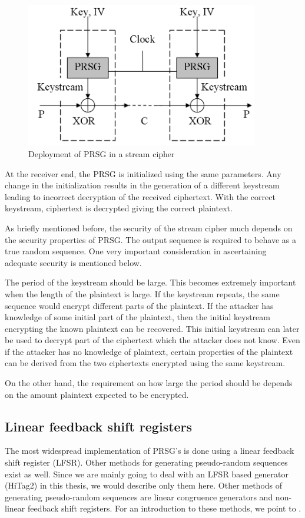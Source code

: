 \begin{figure}[ht!]
	\centering
		\includegraphics[width=4in]{./figures/stream-cipher.PNG}
	\caption{Deployment of PRSG in a stream cipher}	
	\label{fig:stream-cipher}
\end{figure}

At the receiver end, the PRSG is initialized using the same parameters. Any change in the initialization results in the generation of a different keystream leading to incorrect decryption of the received ciphertext. With the correct keystream, ciphertext is decrypted giving the correct plaintext. 

As briefly mentioned before, the security of the stream cipher much depends on the security properties of PRSG. The output sequence is required to behave as a true random sequence. One very important consideration in ascertaining adequate security \cite{robshaw1995sct} is mentioned below.

The period of the keystream should be large. This becomes extremely important when the length of the plaintext is large. If the keystream repeats, the same sequence would encrypt different parts of the plaintext. If the attacker has knowledge of some initial part of the plaintext, then the initial keystream encrypting the known plaintext can be recovered. This initial keystream can later be used to decrypt part of the ciphertext which the attacker does not know. Even if the attacker has no knowledge of plaintext, certain properties of the plaintext can be derived from the two ciphertexts encrypted using the same keystream. 

On the other hand, the requirement on how large the period should be depends on the amount plaintext expected to be encrypted.

\subsection{Linear feedback shift registers} 
\label{sec:lfsr}
The most widespread implementation of PRSG's is done using a linear feedback shift register (LFSR). Other methods for generating pseudo-random sequences exist as well. Since we are mainly going to deal with an LFSR based generator (HiTag2) in this thesis, we would describe only them here. Other methods of generating pseudo-random sequences are linear congruence generators and non-linear feedback shift registers. For an introduction to these methods, we point to \cite{zeng1991pbg}. 

